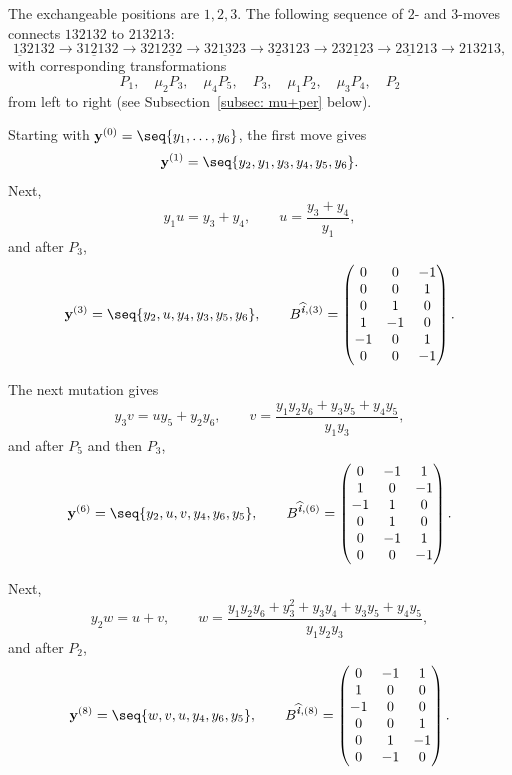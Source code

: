 \documentclass[12pt, leqno]{amsart}
\numberwithin{equation}{section}
\theoremstyle{plain}
\theoremstyle{definition}
\newcommand{\ii}{ \textbf{\textit{i}}}
\newcommand{\hii}{{\widehat{\ii}}}
\newcommand{\bfy}{\mathbf{y}}
\begin{document}
The exchangeable positions are $1,2,3$.  The following sequence of $2$- and $3$-moves connects $132132$ to $213213$:
\[
\underline{13}2132\to3\underline{121}32\to321\underline{232}
\to 32\underline{13}23 \to \underline{323}123
\to23\underline{212}3\to2\underline{31}213\to213213,
\]
with corresponding transformations
\[
P_1,\quad \mu_2P_3,\quad \mu_4P_5,\quad
P_3,\quad \mu_1P_2,\quad \mu_3P_4,\quad P_2
\]
from left to right (see Subsection~\ref{subsec: mu+per} below).

Starting with $\bfy^{(0)}=\seq{y_1,\ldots,y_6}$, the first move gives
\[
\bfy^{(1)}=\seq{y_2,y_1,y_3,y_4,y_5,y_6}.
\]
Next,
\[
y_1u=y_3+y_4, \qquad u=\frac{y_3+y_4}{y_1},
\]
and after $P_3$,
\[
\bfy^{(3)}=\seq{y_2,u,y_4,y_3,y_5,y_6},
\qquad
B^{\hii,(3)}
=
\begin{pmatrix}
0&0&-1\\
0&0&1\\
0&1&0\\
1&-1&0\\
-1&0&1\\
0&0&-1
\end{pmatrix}.
\]

The next mutation gives
\[
y_3v=uy_5+y_2y_6,
\qquad
v=\frac{y_1y_2y_6+y_3y_5+y_4y_5}{y_1y_3},
\]
and after $P_5$ and then $P_3$,
\[
\bfy^{(6)}=\seq{y_2,u,v,y_4,y_6,y_5},
\qquad
B^{\hii,(6)}
=
\begin{pmatrix}
0&-1&1\\
1&0&-1\\
-1&1&0\\
0&1&0\\
0&-1&1\\
0&0&-1
\end{pmatrix}.
\]

Next,
\[
y_2w=u+v,
\qquad
w= \frac{y_1y_2y_6+y_3^2+y_3y_4+y_3y_5+y_4y_5}{y_1y_2y_3},
\]
and after $P_2$,
\[
\bfy^{(8)}=\seq{w,v,u,y_4,y_6,y_5},
\qquad
B^{\hii,(8)}
=
\begin{pmatrix}
0&-1&1\\
1&0&0\\
-1&0&0\\
0&0&1\\
0&1&-1\\
0&-1&0
\end{pmatrix}.
\]
\end{document}
